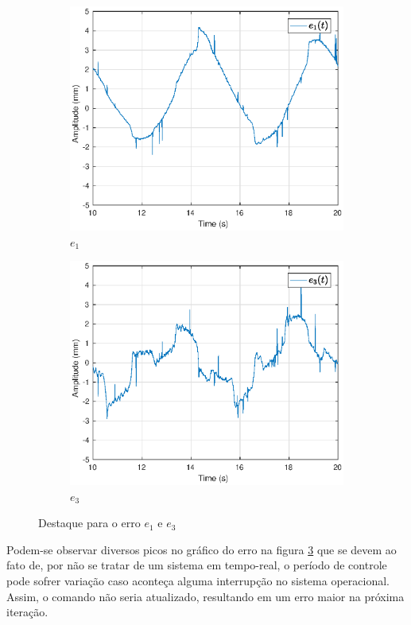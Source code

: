 \begin{figure}[!ht]
\centering
\begin{subfigure}{.5\textwidth}
  \centering
  \includegraphics[width=\linewidth]{./img/trk1/erro1zoom.eps}
  \caption{$e_1$}
  \label{fig:sub1}
\end{subfigure}%
\begin{subfigure}{.5\textwidth}
  \centering
  \includegraphics[width=\linewidth]{./img/trk1/erro3zoom.eps}
  \caption{$e_3$}
  \label{fig:sub2}
\end{subfigure}
\caption{Destaque para o erro $e_1$ e $e_3$ }
\label{fig:erro_traj}
\end{figure}

Podem-se observar diversos picos no gráfico do erro na figura \ref{fig:erro_traj} que se devem ao fato de, por não se tratar de um sistema em tempo-real, o período de controle pode sofrer variação caso aconteça alguma interrupção no sistema operacional. Assim, o comando não seria atualizado, resultando em um erro maior na próxima iteração.